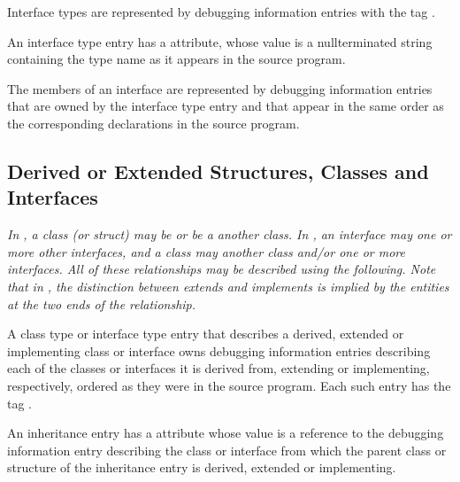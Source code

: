 Interface types 
are represented by debugging information
entries with the 
tag \DWTAGinterfacetypeTARG.

An interface type entry has 
a \DWATname{} attribute,
whose
value is a null\dash terminated string containing the type name
as it appears in the source program.

The members of an interface are represented by debugging
information entries that are owned by the interface type
entry and that appear in the same order as the corresponding
declarations in the source program.

\subsection{Derived or Extended Structures, Classes and Interfaces}
\label{chap:derivedorextendedstructsclasesandinterfaces}

\textit{In , a class (or struct) 
may 
be  or be a
 another class. 
In , an interface may 
one 
or more other interfaces, and a class may  another
class and/or  one or more interfaces. All of these
relationships may be described using the following. Note that
in , 
the distinction between extends and implements is
implied by the entities at the two ends of the relationship.}

A class type or interface type entry that describes a
derived, extended or implementing class or interface owns
debugging information entries describing each of the classes
or interfaces it is derived from, extending or implementing,
respectively, ordered as they were in the source program. Each
such entry has 
the 
tag \DWTAGinheritanceTARG.

An inheritance entry 
has 
a 
\DWATtype{} attribute whose value is
a reference to the debugging information entry describing the
class or interface from which the parent class or structure
of the inheritance entry is derived, extended or implementing.

